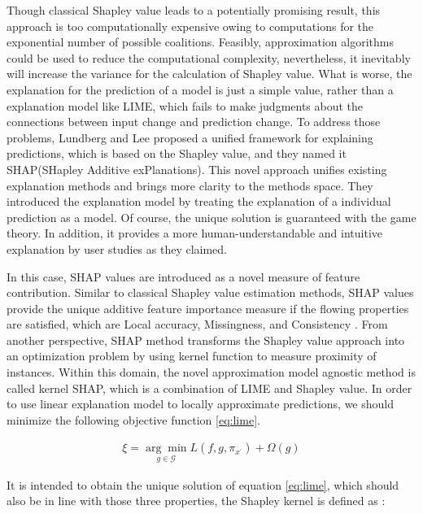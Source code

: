Though classical Shapley value leads to a potentially promising result, this approach is too computationally expensive owing to computations for the exponential number of possible coalitions. Feasibly, approximation algorithms could be used to reduce the computational complexity, nevertheless, it inevitably will increase the variance for the calculation of Shapley value. What is worse, the explanation for the prediction of a model is just a simple value, rather than a explanation model like LIME, which fails to make judgments about the connections between input change and prediction change. To address those problems, Lundberg and Lee \cite{lundberg2017unified} proposed a unified framework for explaining predictions, which is based on the Shapley value, and they named it SHAP(SHapley Additive exPlanations). This novel approach unifies existing explanation methods and brings more clarity to the methods space. They introduced the explanation model by treating the explanation of a individual prediction as a model. Of course, the unique solution is guaranteed with the game theory. In addition, it provides a more human-understandable and intuitive explanation by user studies as they claimed. 

In this case, SHAP values are introduced as a novel measure of feature contribution. Similar to classical Shapley value estimation methods, SHAP values provide the unique additive feature importance measure if the flowing properties are satisfied, which are Local accuracy, Missingness, and Consistency \cite{lundberg2017unified}. From another perspective, SHAP method transforms the Shapley value approach into an optimization problem by using kernel function to measure proximity of instances. Within this domain, the novel approximation model agnostic method is called kernel SHAP, which is a combination of LIME and Shapley value. In order to use linear explanation model to locally approximate predictions, we should minimize the following objective function \ref{eq:lime}. 

\begin{equation} \label{eq:lime}
\begin{gathered}
\xi=\underset{g \in \mathcal{G}}{\arg \min } L\left(f, g, \pi_{x^{\prime}}\right)+\Omega(g)
\end{gathered}
\end{equation}

It is intended to obtain the unique solution of equation \ref{eq:lime}, which should also be in line with those three properties, the Shapley kernel is defined as \cite{lundberg2017unified}:

